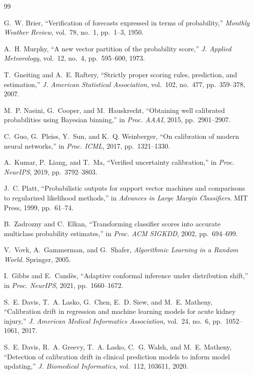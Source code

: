\documentclass[conference]{IEEEtran}
\begin{document}
\begin{thebibliography}{99}\itemsep2pt

 G.~W. Brier, ``Verification of forecasts expressed in
terms of probability,'' \emph{Monthly Weather Review}, vol.~78, no.~1,
pp.~1--3, 1950.

 A.~H. Murphy, ``A new vector partition of the
probability score,'' \emph{J. Applied Meteorology}, vol.~12, no.~4,
pp.~595--600, 1973.

 T.~Gneiting and A.~E. Raftery, ``Strictly proper
scoring rules, prediction, and estimation,'' \emph{J. American Statistical
Association}, vol.~102, no.~477, pp.~359--378, 2007.

 M.~P. Naeini, G.~Cooper, and M.~Hauskrecht, ``Obtaining
well calibrated probabilities using Bayesian binning,'' in \emph{Proc. AAAI},
2015, pp.~2901--2907.

 C.~Guo, G.~Pleiss, Y.~Sun, and K.~Q. Weinberger, ``On
calibration of modern neural networks,'' in \emph{Proc. ICML}, 2017,
pp.~1321--1330.

 A.~Kumar, P.~Liang, and T.~Ma, ``Verified uncertainty
calibration,'' in \emph{Proc. NeurIPS}, 2019, pp.~3792--3803.

 J.~C. Platt, ``Probabilistic outputs for support vector
machines and comparisons to regularized likelihood methods,'' in
\emph{Advances in Large Margin Classifiers}. MIT Press, 1999, pp.~61--74.

 B.~Zadrozny and C.~Elkan, ``Transforming classifier
scores into accurate multiclass probability estimates,'' in \emph{Proc. ACM
SIGKDD}, 2002, pp.~694--699.

 V.~Vovk, A.~Gammerman, and G.~Shafer, \emph{Algorithmic
Learning in a Random World}. Springer, 2005.

 I.~Gibbs and E.~Cand\`es, ``Adaptive conformal inference
under distribution shift,'' in \emph{Proc. NeurIPS}, 2021, pp.~1660--1672.

 S.~E. Davis, T.~A. Lasko, G.~Chen, E.~D. Siew, and
M.~E. Matheny, ``Calibration drift in regression and machine learning models
for acute kidney injury,'' \emph{J. American Medical Informatics
Association}, vol.~24, no.~6, pp.~1052--1061, 2017.

 S.~E. Davis, R.~A. Greevy, T.~A. Lasko,
C.~G. Walsh, and M.~E. Matheny, ``Detection of calibration drift in clinical
prediction models to inform model updating,'' \emph{J. Biomedical
Informatics}, vol.~112, 103611, 2020.


\end{thebibliography}
\end{document}

